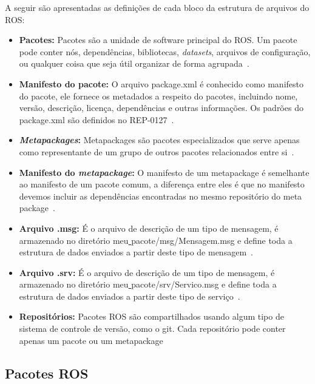 A seguir são apresentadas as definições de cada bloco da estrutura de arquivos do ROS\@:
\begin{itemize}
    \item \textbf{Pacotes:} Pacotes são a unidade de software principal do ROS\@. Um pacote pode conter nós, dependências, bibliotecas, \textit{datasets}, arquivos de configuração, ou qualquer coisa que seja útil organizar de forma agrupada~\cite{RosPKG}.

    \item \textbf{Manifesto do pacote:} O arquivo package.xml é conhecido como manifesto do pacote, ele fornece os metadados a respeito do pacotes, incluindo nome, versão, descrição, licença, dependências e outras informações. Os padrões do package.xml são definidos no REP-0127~\cite{RosPkgXml}.
    
    \item \textbf{\textit{Metapackages}:} Metapackages são pacotes especializados que serve apenas como representante de um grupo de outros pacotes relacionados entre si~\cite{RosMtaPkg}.
    
    \item \textbf{Manifesto do \textit{metapackage}:} O manifesto de um metapackage é semelhante ao manifesto de um pacote comum, a diferença entre eles é que no manifesto devemos incluir as dependências encontradas no mesmo repositório do meta package~\cite{RosPkgXml}.
    
    \item \textbf{Arquivo .msg:} É o arquivo de descrição de um tipo de mensagem, é armazenado no diretório meu\underline{ }pacote/msg/Mensagem.msg e define toda a estrutura de dados enviados a partir deste tipo de mensagem~\cite{RosMessage}.
    
    \item \textbf{Arquivo .srv:} É o arquivo de descrição de um tipo de mensagem, é armazenado no diretório meu\underline{ }pacote/srv/Servico.msg e define toda a estrutura de dados enviados a partir deste tipo de serviço~\cite{RosService}.
    
    \item \textbf{Repositórios:} Pacotes ROS são compartilhados usando algum tipo de sistema de controle de versão, como o git. Cada repositório pode conter apenas um pacote ou um metapackage 
\end{itemize}


\subsection{Pacotes ROS}

